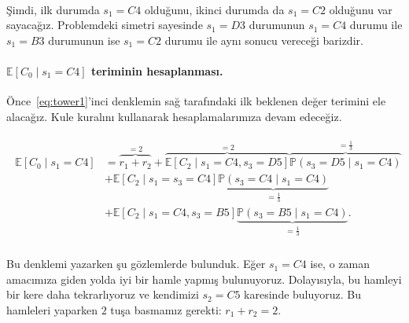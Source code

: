 %
\hphantom{aha} \\[-2ex]
\c{S}imdi, ilk durumda $s_1 = C4$ oldu\u{g}unu, ikinci durumda da $s_1 = C2$
oldu\u{g}unu var sayaca\u{g}{\i}z. Problemdeki simetri sayesinde $s_1 = D3$
durumunun $s_1 = C4$ durumu ile $s_1 = B3$ durumunun ise $s_1 = C2$ durumu ile
ayn{\i} sonucu verece\u{g}i barizdir. 

\vspace{-3mm}
\paragraph{$\mathbb{E}\left[ C_0 \mid s_1 = C4 \right]$ teriminin
hesaplanmas{\i}.} \"{O}nce~\eqref{eq:tower1}'inci denklemin sa\u{g}
taraf{\i}ndaki ilk beklenen de\u{g}er terimini ele alaca\u{g}{\i}z. Kule
kural{\i}n{\i} kullanarak hesaplamalar{\i}m{\i}za devam edece\u{g}iz. 

\vspace{-8mm}
\begin{align}
    \begin{split}
    \mathbb{E}\left[ C_0 \mid s_1 = C4 \right] &= \overbrace{r_1 + r_2}^{=2} 
    + \overbrace{\mathbb{E}[C_2 \mid s_1 = C4, s_3 = D5]}^{=2} \overbrace{\mathbb{P}(s_3 = D5 \mid s_1 = C4)}^{=\frac{1}{3}} \\
    &+ \mathbb{E}[C_2 \mid s_1 = s_3 = C4] \underbrace{\mathbb{P}(s_3 = C4 \mid s_1 = C4)}_{=\frac{1}{3}} \\
    &+ \mathbb{E}[C_2 \mid s_1 = C4, s_3 = B5] \underbrace{\mathbb{P}(s_3 = B5 \mid s_1 = C4)}_{=\frac{1}{3}}.
    \end{split}
    \label{eq:tower2}
\end{align}
%
\hphantom{aha} \\[-3ex]
Bu denklemi yazarken \c{s}u g\"{o}zlemlerde bulunduk. E\u{g}er $s_1 = C4$ ise, o
zaman amac{\i}m{\i}za giden yolda iyi bir hamle yapm{\i}\c{s} bulunuyoruz.
Dolay{\i}s{\i}yla, bu hamleyi bir kere daha tekrarl{\i}yoruz ve kendimizi $s_2 =
C5$ karesinde buluyoruz. Bu hamleleri yaparken $2$ tu\c{s}a basmam{\i}z gerekti:
$r_1 + r_2 = 2$.

